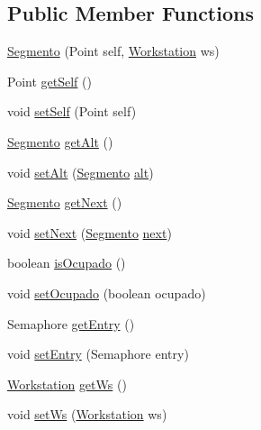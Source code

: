 \subsection*{Public Member Functions}
\begin{DoxyCompactItemize}
\item 
\mbox{\hyperlink{classsimulator_1_1_segmento_a441279b72c14ab4e5dab49098eec3dac}{Segmento}} (Point self, \mbox{\hyperlink{classsimulator_1_1_workstation}{Workstation}} ws)
\item 
Point \mbox{\hyperlink{classsimulator_1_1_segmento_a64e246e93f409c3a97798e6b9e63ab42}{get\+Self}} ()
\item 
void \mbox{\hyperlink{classsimulator_1_1_segmento_acc6bd49b531123d4237b514521612840}{set\+Self}} (Point self)
\item 
\mbox{\hyperlink{classsimulator_1_1_segmento}{Segmento}} \mbox{\hyperlink{classsimulator_1_1_segmento_a431ce967de52a69163b325da75c785e2}{get\+Alt}} ()
\item 
void \mbox{\hyperlink{classsimulator_1_1_segmento_a9e0d189b9589c76a15b179de7fe716cb}{set\+Alt}} (\mbox{\hyperlink{classsimulator_1_1_segmento}{Segmento}} \mbox{\hyperlink{classsimulator_1_1_segmento_a0ac22ab701cfb44a6ca41cc831df2695}{alt}})
\item 
\mbox{\hyperlink{classsimulator_1_1_segmento}{Segmento}} \mbox{\hyperlink{classsimulator_1_1_segmento_a1a77a639c0f488b247294f4d57026dc3}{get\+Next}} ()
\item 
void \mbox{\hyperlink{classsimulator_1_1_segmento_a3ff40757a382f8247fd7a3cc70043e58}{set\+Next}} (\mbox{\hyperlink{classsimulator_1_1_segmento}{Segmento}} \mbox{\hyperlink{classsimulator_1_1_segmento_a1cceb01f5ffd65b3a53422fa9e05913c}{next}})
\item 
boolean \mbox{\hyperlink{classsimulator_1_1_segmento_a0da0a40fad9f388e76ce57b6ce072430}{is\+Ocupado}} ()
\item 
void \mbox{\hyperlink{classsimulator_1_1_segmento_a3b8d3958f5ae252c1a9ee2f015040004}{set\+Ocupado}} (boolean ocupado)
\item 
Semaphore \mbox{\hyperlink{classsimulator_1_1_segmento_a023207e6de068a9ebade1b88c477a756}{get\+Entry}} ()
\item 
void \mbox{\hyperlink{classsimulator_1_1_segmento_a412c9085c2cc99e41eb537dd7e0d8e66}{set\+Entry}} (Semaphore entry)
\item 
\mbox{\hyperlink{classsimulator_1_1_workstation}{Workstation}} \mbox{\hyperlink{classsimulator_1_1_segmento_aacd44ec934de39929837f8f3818e2e3b}{get\+Ws}} ()
\item 
void \mbox{\hyperlink{classsimulator_1_1_segmento_a87bee1b2574d78489fb898eff6b45245}{set\+Ws}} (\mbox{\hyperlink{classsimulator_1_1_workstation}{Workstation}} ws)
\end{DoxyCompactItemize}
